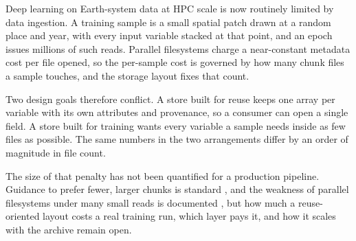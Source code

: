 \documentclass[gmd, manuscript]{copernicus}
\begin{document}
\begin{abstract}
\begin{itemize}
\item Problem: the layout that makes data FAIR is not the layout that trains fast.
\item Two representations: interoperable Zarr store vs.\ training-optimised merged store.
\item Result (measured): 7.6$\times$ per-sample on a 16-year record and 19$\times$ on the
  full historical one; 4.6$\times$ end-to-end on one node; a 10-epoch production training
  cut from ${\sim}55$\,h to 2.3\,h against the five-store baseline.
\item Contribution: an automated bridge, plus the released 1850--2100 land-use cube.
\end{itemize}
\end{abstract}




\introduction  %
\label{sec:intro}

Deep learning on Earth-system data at HPC scale is now routinely limited by data ingestion. A
training sample is a small spatial patch drawn at a random place and year, with every input
variable stacked at that point, and an epoch issues millions of such reads. Parallel
filesystems charge a near-constant metadata cost per file opened, so the per-sample cost is
governed by how many chunk files a sample touches, and the storage layout fixes that count.

Two design goals therefore conflict. A store built for reuse keeps one array per variable with
its own attributes and provenance, so a consumer can open a single field. A store built for
training wants every variable a sample needs inside as few files as possible. The same numbers
in the two arrangements differ by an order of magnitude in file count.

The size of that penalty has not been quantified for a production pipeline. Guidance to prefer
fewer, larger chunks is standard \citep{dask_chunks, abernathey2021}, and the weakness of
parallel filesystems under many small reads is documented \citep{nextplatform_hpcfs,
vef2016gpfs}, but how much a reuse-oriented layout costs a real training run, which layer pays
it, and how it scales with the archive remain open.
\end{document}
